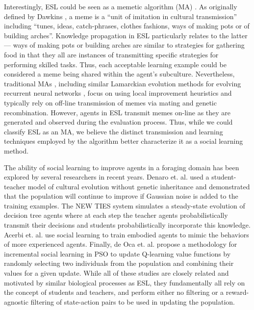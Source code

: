 \documentclass{sig-alternate}
\begin{document}
Interestingly, ESL could be seen as a memetic algorithm (MA) \cite{moscato1989evolution}. As originally defined by Dawkins \cite{dawkins2006selfish}, a meme is a ``unit of imitation in cultural transmission'' including ``tunes, ideas, catch-phrases, clothes fashions, ways of making pots or of building arches''. Knowledge propagation in ESL particularly relates to the latter--- ways of making pots or building arches are similar to strategies for gathering food in that they all are instances of transmitting specific strategies for performing skilled tasks. Thus, each acceptable learning example could be considered a meme being shared within the agent's subculture. Nevertheless, traditional MAs \cite{onwubolu2004new}, including similar Lamarckian evolution methods for evolving recurrent neural networks \cite{ku2000study}, focus on using local improvement heuristics and typically rely on off-line transmission of memes via mating and genetic recombination. However, agents in ESL transmit memes on-line as they are generated and observed during the evaluation process. Thus, while we could classify ESL as an MA, we believe the distinct transmission and learning techniques employed by the algorithm better characterize it as a social learning method.

The ability of social learning to improve agents in a foraging domain has been explored by several researchers in recent years. Denaro et. al. \cite{denaro1996cultural} used a student-teacher model of cultural evolution without genetic inheritance and demonstrated that the population will continue to improve if Gaussian noise is added to the training examples. The NEW TIES system \cite{haasdijk2008social, vogt2010modeling} simulates a steady-state evolution of decision tree agents where at each step the teacher agents probabilistically transmit their decisions and students probabilistically incorporate this knowledge. Acerbi et. al. \cite{acerbi2007social} use social learning to train embodied agents to mimic the behaviors of more experienced agents. Finally, de Oca et. al. \cite{de2011incremental} propose a methodology for incremental social learning in PSO to update Q-learning \cite{watkins1992q} value functions by randomly selecting two individuals from the population and combining their values for a given update. While all of these studies are closely related and motivated by similar biological processes as ESL, they fundamentally all rely on the concept of students and teachers, and perform either no filtering or a reward-agnostic filtering of state-action pairs to be used in updating the population.
\end{document}
